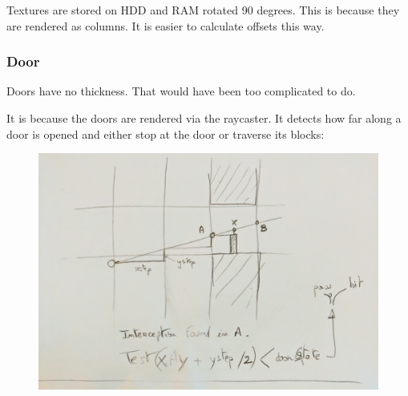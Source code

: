  Textures are stored on HDD and RAM rotated 90 degrees. This is because they are rendered as columns. It is easier to calculate offsets this way.\\
\par

 





\subsubsection{Door}
Doors have no thickness. That would have been too complicated to do.\\
\par
\begin{figure}[H]
 \centering
\end{figure}

\par
It is because the doors are rendered via the raycaster. It detects how far along a door is opened and either stop at the door or traverse its blocks:\\

\begin{minipage}{\textwidth}

\end{minipage}

\par 
 \par
\begin{figure}[H]
  \centering
 \includegraphics[width=\textwidth]{imgs/drawings/test_door.png}
\end{figure}
\par













